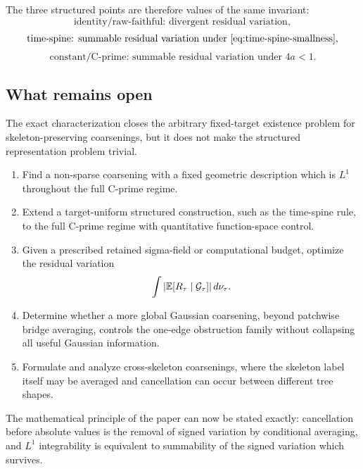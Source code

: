 The three structured points are therefore values of the same invariant:
\begin{equation*}
  \text{identity/raw-faithful: divergent residual variation},
\end{equation*}
\begin{equation*}
  \text{time-spine: summable residual variation under~\eqref{eq:time-spine-smallness}},
\end{equation*}
\begin{equation*}
  \text{constant/C-prime: summable residual variation under }4a<1.
\end{equation*}

\subsection{What remains open}

The exact characterization closes the arbitrary fixed-target existence problem for skeleton-preserving coarsenings, but it does not make the structured representation problem trivial.

\begin{enumerate}[label=\textup{(\roman*)}]
\item Find a non-sparse coarsening with a fixed geometric description which is $L^1$ throughout the full C-prime regime.
\item Extend a target-uniform structured construction, such as the time-spine rule, to the full C-prime regime with quantitative function-space control.
\item Given a prescribed retained sigma-field or computational budget, optimize the residual variation
\begin{equation*}
  \int
  \left|\mathbb E[R_\tau\mid\mathcal G_\tau]\right|
  d\nu_\tau.
\end{equation*}
\item Determine whether a more global Gaussian coarsening, beyond patchwise bridge averaging, controls the one-edge obstruction family without collapsing all useful Gaussian information.
\item Formulate and analyze cross-skeleton coarsenings, where the skeleton label itself may be averaged and cancellation can occur between different tree shapes.
\end{enumerate}

The mathematical principle of the paper can now be stated exactly: cancellation before absolute values is the removal of signed variation by conditional averaging, and $L^1$ integrability is equivalent to summability of the signed variation which survives.
